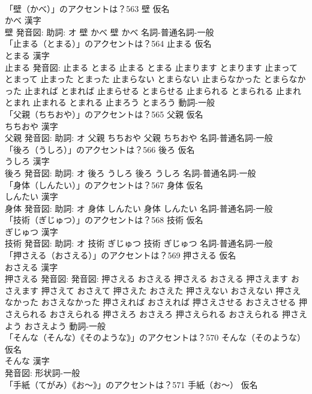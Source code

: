\documentclass[8pt]{extreport}
\begin{document}
\begin{CJK}{UTF8}{min}
\\	「壁（かべ）」のアクセントは？563	壁 仮名　
\\	かべ 漢字　
\\	壁 発音図: 助詞: オ	壁 かべ		壁 かべ				名詞-普通名詞-一般 
\\	「止まる（とまる）」のアクセントは？564	止まる 仮名　
\\	とまる 漢字　
\\	止まる 発音図:	止まる とまる		止まる とまる 止まります とまります 止まって とまって 止まった とまった 止まらない とまらない 止まらなかった とまらなかった 止まれば とまれば 止まらせる とまらせる 止まられる とまられる 止まれ とまれ 止まれる とまれる 止まろう とまろう				動詞-一般 
\\	「父親（ちちおや）」のアクセントは？565	父親 仮名　
\\	ちちおや 漢字　
\\	父親 発音図: 助詞: オ	父親 ちちおや		父親 ちちおや				名詞-普通名詞-一般 
\\	「後ろ（うしろ）」のアクセントは？566	後ろ 仮名　
\\	うしろ 漢字　
\\	後ろ 発音図: 助詞: オ	後ろ うしろ		後ろ うしろ				名詞-普通名詞-一般 
\\	「身体（しんたい）」のアクセントは？567	身体 仮名　
\\	しんたい 漢字　
\\	身体 発音図: 助詞: オ	身体 しんたい		身体 しんたい				名詞-普通名詞-一般 
\\	「技術（ぎじゅつ）」のアクセントは？568	技術 仮名　
\\	ぎじゅつ 漢字　
\\	技術 発音図: 助詞: オ	技術 ぎじゅつ		技術 ぎじゅつ				名詞-普通名詞-一般 
\\	「押さえる（おさえる）」のアクセントは？569	押さえる 仮名　
\\	おさえる 漢字　
\\	押さえる 発音図: 発音図:	押さえる おさえる		押さえる おさえる 押さえます おさえます 押さえて おさえて 押さえた おさえた 押さえない おさえない 押さえなかった おさえなかった 押さえれば おさえれば 押さえさせる おさえさせる 押さえられる おさえられる 押さえろ おさえろ 押さえられる おさえられる 押さえよう おさえよう				動詞-一般 
\\	「そんな（そんな）《そのような》」のアクセントは？570	そんな（そのような） 仮名　
\\	そんな 漢字　
\\	発音図:							形状詞-一般 
\\	「手紙（てがみ）《お〜》」のアクセントは？571	手紙（お〜） 仮名　

\end{CJK}
\end{document}
